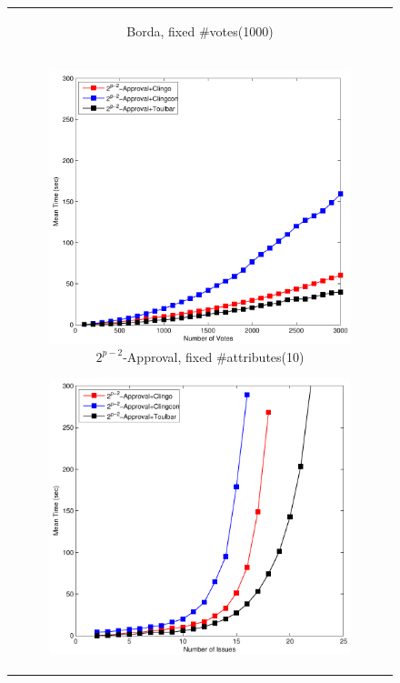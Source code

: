 \begin{figure}[ht!]
\begin{tabular}{c}
\begin{subfigure}[b]{0.44\textwidth}
    \caption{Borda, fixed \#votes(1000)}
		\label{fig:comparison:win:2}
	\end{subfigure}
  \\
  \begin{subfigure}[b]{0.44\textwidth}
		\includegraphics[width=\textwidth]{figs/expAppFIMSCICP.pdf}
    \caption{$2^{p-2}$-Approval, fixed \#attributes(10)}
		\label{fig:comparison:win:3}
	\end{subfigure}
  \begin{subfigure}[b]{0.44\textwidth}
		\includegraphics[width=\textwidth]{figs/expAppFVMSCICP.pdf}

\end{subfigure}
\end{tabular}
\end{figure}
